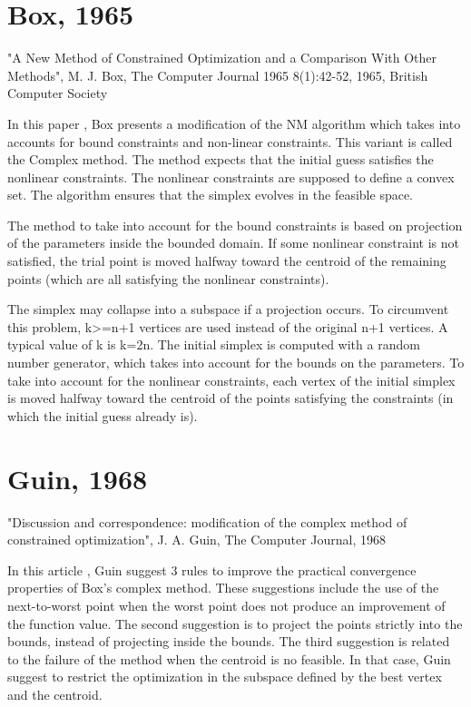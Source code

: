 \section{Box, 1965}

"A New Method of Constrained Optimization and a Comparison With Other Methods",
M. J. Box,
The Computer Journal 1965 8(1):42-52,
1965, British Computer Society

In this paper \cite{Box1965}, Box presents a modification of the NM algorithm which 
takes into accounts for bound constraints and non-linear constraints.
This variant is called the Complex method. 
The method expects that the initial guess satisfies the nonlinear constraints.
The nonlinear constraints are supposed to define a convex set.
The algorithm ensures that the simplex evolves in the feasible space.

The method to take into account for the bound constraints is based on 
projection of the parameters inside the bounded domain. If some 
nonlinear constraint is not satisfied, the trial point is moved halfway
toward the centroid of the remaining points (which are all satisfying 
the nonlinear constraints).

The simplex may collapse into a subspace if a projection occurs. To 
circumvent this problem, k>=n+1 vertices are used instead of the original 
n+1 vertices. A typical value of k is k=2n. The initial simplex is computed with a random number 
generator, which takes into account for the bounds on the parameters. To 
take into account for the nonlinear constraints, each vertex of the 
initial simplex is moved halfway toward the centroid of the points 
satisfying the constraints (in which the initial guess already is).

\section{Guin, 1968}

"Discussion and correspondence: modification of the complex method of constrained optimization",
J. A. Guin,
The Computer Journal,
1968

In this article \cite{Guin:1968:DCM}, Guin suggest 3 rules to improve the practical convergence 
properties of Box's complex method. These suggestions include the use of the 
next-to-worst point when the worst point does not produce an improvement 
of the function value. The second suggestion is to project the points 
strictly into the bounds, instead of projecting inside the bounds.
The third suggestion is related to the failure of the method
when the centroid is no feasible. In that case, Guin suggest to 
restrict the optimization in the subspace defined by the best 
vertex and the centroid.

